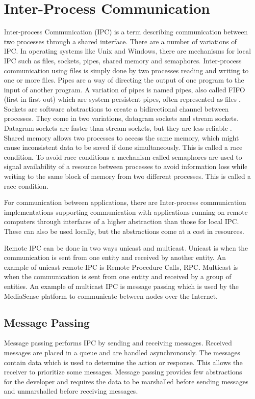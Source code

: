 \section{Inter-Process Communication}
Inter-process Communication (IPC) is a term describing communication between two processes through a shared interface. There are a number of variations of IPC. In operating systems like Unix and Windows, there are mechanisms for local IPC such as files, sockets, pipes, shared memory and semaphores. 
Inter-process communication using files is simply done by two processes reading and writing to one or more files. Pipes are a way of directing the output of one program to the input of another program. A variation of pipes is named pipes, also called FIFO (first in first out) which are system persistent pipes, often represented as files \cite{Lewandowski97interprocesscommunication}. Sockets are software abstractions to create a bidirectional channel between processes. They come in two variations, datagram sockets and stream sockets. Datagram sockets are faster than stream sockets, but they are less reliable \cite{Lewandowski97interprocesscommunication}. Shared memory allows two processes to access the same memory, which might cause inconsistent data to be saved if done simultaneously. This is called a race condition. To avoid race conditions a mechanism called semaphores are used to signal availability of a resource between processes to avoid information loss while writing to the same block of memory from two different processes. This is called a race condition. 

For communication between applications, there are Inter-process communication implementations supporting communication with applications running on remote computers through interfaces of a higher abstraction than those for local IPC. These can also be used locally, but the abstractions come at a cost in resources.

Remote IPC can be done in two ways unicast and multicast. Unicast is when the communication is sent from one entity and received by another entity. An example of unicast remote IPC is Remote Procedure Calls, RPC. Multicast is when the communication is sent from one entity and received by a group of entities. An example of multicast IPC is message passing which is used by the MediaSense platform to communicate between nodes over the Internet.

\subsection{Message Passing}
Message passing performs IPC by sending and receiving messages. Received messages are placed in a queue and are handled asynchronously.
The messages contain data which is used to determine the action or response. This allows the receiver to prioritize some messages. Message passing provides few abstractions for the developer and requires the data to be marshalled before sending messages and unmarshalled before receiving messages. 

